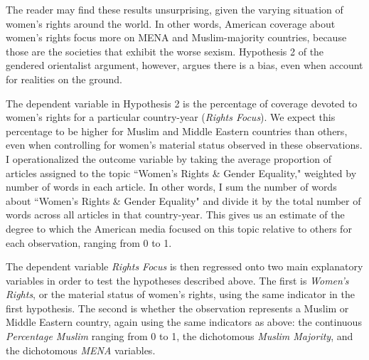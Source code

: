 \documentclass[11pt, oneside]{article}
\begin{document}
The reader may find these results unsurprising, given the varying situation of women's rights around the world. In other words, American coverage about women's rights focus more on MENA and Muslim-majority countries, because those are the societies that exhibit the worse sexism. Hypothesis 2 of the gendered orientalist argument, however, argues there is a bias, even when account for realities on the ground.

The dependent variable in Hypothesis 2 is the percentage of coverage devoted to women's rights for a particular country-year (\emph{Rights Focus}).  We expect this percentage to be higher for Muslim and Middle Eastern countries than others, even when controlling for women's material status observed in these observations. I operationalized the outcome variable by taking the average proportion of articles assigned to the topic ``Women's Rights \& Gender Equality," weighted by number of words in each article. In other words, I sum the number of words about ``Women's Rights \& Gender Equality" and divide it by the total number of words across all articles in that country-year.  This gives us an estimate of the degree to which the American media focused on this topic relative to others for each observation, ranging from 0 to 1.

The dependent variable \emph{Rights Focus} is then regressed onto two main explanatory variables in order to test the hypotheses described above. The first is \emph{Women's Rights}, or the material status of women's rights, using the same indicator in the first hypothesis. The second is whether the observation represents a Muslim or Middle Eastern country, again using the same indicators as above: the continuous \emph{Percentage Muslim} ranging from 0 to 1, the dichotomous \emph{Muslim Majority}, and the dichotomous \emph{MENA} variables. 
\end{document}
